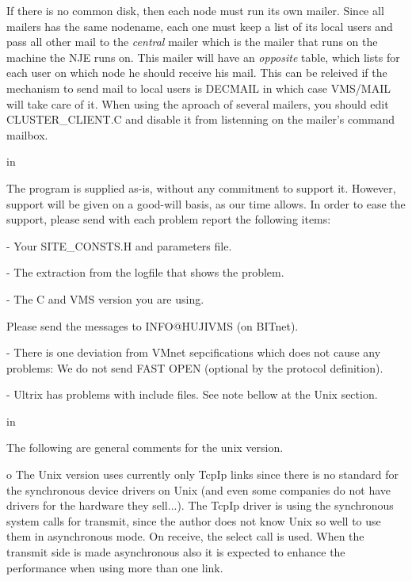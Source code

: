 If  there  is  no  common  disk, then each node must run its own mailer.
Since all mailers has the same nodename, each one must keep  a  list  of
its  local  users and pass all other mail to the {\sl central} mailer which is
the mailer that runs on the machine the NJE runs on.  This  mailer  will
have  an  {\sl opposite} table,  which  lists  for each user on which node he
should receive his mail. This can be releived if the mechanism  to  send
mail  to local users is DECMAIL in which case VMS/MAIL will take care of
it.  {\ncrBold When  using  the  aproach  of  several  mailers,  you  should
edit CLUSTER\_CLIENT.C  and disable it from listenning on the mailer's command
mailbox.}

 in

The program is supplied as-is, without any commitment to support  it.
However, support will be given on a good-will basis, as our time allows.
In order to ease the support, please send with each problem  report  the
following items:

- Your SITE\_CONSTS.H and parameters file.

- The extraction from the logfile that shows the problem.

- The C and VMS version you are using.

Please send the messages to INFO@HUJIVMS (on BITnet).

\vfill\eject


- There  is one deviation from VMnet sepcifications which does not cause
any problems: We do  not  send  FAST  OPEN  (optional  by  the  protocol
definition).

- Ultrix  has  problems  with include files. See note bellow at the Unix
section.

 in

The following are general comments for the unix version.

{\ncrBold o}
 The Unix version uses currently only TcpIp links  since  there  is  no
standard  for  the  synchronous  device  drivers  on Unix (and even some
companies do not have drivers for the hardware they sell...). The  TcpIp
driver  is  using  the  synchronous system calls for transmit, since the
author does not know Unix so well to use them in asynchronous  mode.  On
receive,  the  select  call  is  used.  When  the  transmit side is made
asynchronous also it is expected to enhance the performance  when  using
more than one link.

